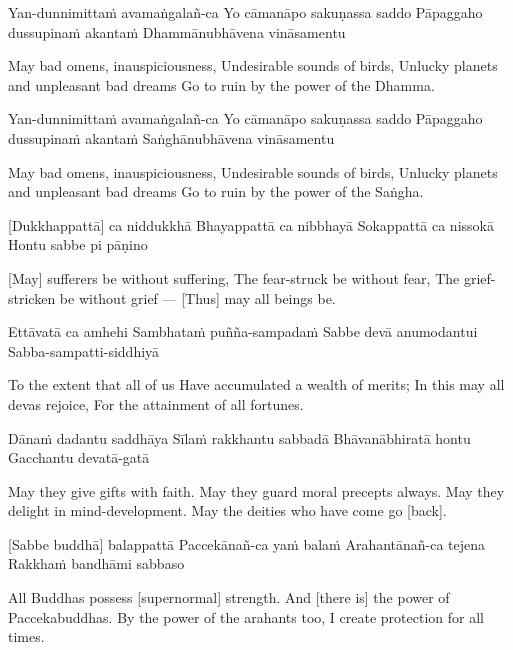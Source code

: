 \begin{english}
\begin{english}
Yan-dunnimittaṁ avamaṅgalañ-ca
Yo cāmanāpo sakuṇassa saddo
Pāpaggaho dussupinaṁ akantaṁ
Dhammānubhāvena vināsamentu

\begin{english}
May bad omens, inauspiciousness,
Undesirable sounds of birds,
Unlucky planets and unpleasant bad dreams
Go to ruin by the power of the Dhamma.
\end{english}

Yan-dunnimittaṁ avamaṅgalañ-ca
Yo cāmanāpo sakuṇassa saddo
Pāpaggaho dussupinaṁ akantaṁ
Saṅghānubhāvena vināsamentu

\begin{english}
May bad omens, inauspiciousness,
Undesirable sounds of birds,
Unlucky planets and unpleasant bad dreams
Go to ruin by the power of the Saṅgha.
\end{english}

\suttaRef{[Trad]}

[Dukkhappattā] ca niddukkhā
Bhayappattā ca nibbhayā
Sokappattā ca nissokā
Hontu sabbe pi pāṇino

\begin{english}
[May] sufferers be without suffering,
The fear-struck be without fear,
The grief-stricken be without grief —
[Thus] may all beings be.
\end{english}

Ettāvatā ca amhehi
Sambhataṁ puñña-sampadaṁ
Sabbe devā anumodantui
Sabba-sampatti-siddhiyā

\begin{english}
To the extent that all of us
Have accumulated a wealth of merits;
In this may all devas rejoice,
For the attainment of all fortunes.
\end{english}

Dānaṁ dadantu saddhāya
Sīlaṁ rakkhantu sabbadā
Bhāvanābhiratā hontu
Gacchantu devatā-gatā

\begin{english}
May they give gifts with faith.
May they guard moral precepts always.
May they delight in mind-development.
May the deities who have come go [back].
\end{english}

[Sabbe buddhā] balappattā
Paccekānañ-ca yaṁ balaṁ
Arahantānañ-ca tejena
Rakkhaṁ bandhāmi sabbaso

\begin{english}
All Buddhas possess [supernormal] strength.
And [there is] the power of Paccekabuddhas.
By the power of the arahants too,
I create protection for all times.
\end{english}


\end{english}
\end{english}
